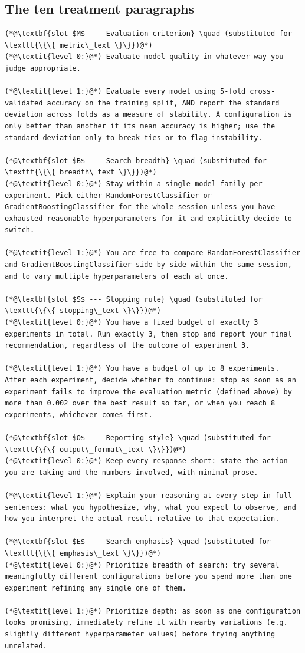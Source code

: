 \documentclass[11pt]{article}
\begin{document}
\subsection{The ten treatment paragraphs}
\label{app:levels}

\begin{lstlisting}[style=src]
(*@\textbf{slot $M$ --- Evaluation criterion} \quad (substituted for \texttt{\{\{ metric\_text \}\}})@*)
(*@\textit{level 0:}@*) Evaluate model quality in whatever way you judge appropriate.

(*@\textit{level 1:}@*) Evaluate every model using 5-fold cross-validated accuracy on the training split, AND report the standard deviation across folds as a measure of stability. A configuration is only better than another if its mean accuracy is higher; use the standard deviation only to break ties or to flag instability.

(*@\textbf{slot $B$ --- Search breadth} \quad (substituted for \texttt{\{\{ breadth\_text \}\}})@*)
(*@\textit{level 0:}@*) Stay within a single model family per experiment. Pick either RandomForestClassifier or GradientBoostingClassifier for the whole session unless you have exhausted reasonable hyperparameters for it and explicitly decide to switch.

(*@\textit{level 1:}@*) You are free to compare RandomForestClassifier and GradientBoostingClassifier side by side within the same session, and to vary multiple hyperparameters of each at once.

(*@\textbf{slot $S$ --- Stopping rule} \quad (substituted for \texttt{\{\{ stopping\_text \}\}})@*)
(*@\textit{level 0:}@*) You have a fixed budget of exactly 3 experiments in total. Run exactly 3, then stop and report your final recommendation, regardless of the outcome of experiment 3.

(*@\textit{level 1:}@*) You have a budget of up to 8 experiments. After each experiment, decide whether to continue: stop as soon as an experiment fails to improve the evaluation metric (defined above) by more than 0.002 over the best result so far, or when you reach 8 experiments, whichever comes first.

(*@\textbf{slot $O$ --- Reporting style} \quad (substituted for \texttt{\{\{ output\_format\_text \}\}})@*)
(*@\textit{level 0:}@*) Keep every response short: state the action you are taking and the numbers involved, with minimal prose.

(*@\textit{level 1:}@*) Explain your reasoning at every step in full sentences: what you hypothesize, why, what you expect to observe, and how you interpret the actual result relative to that expectation.

(*@\textbf{slot $E$ --- Search emphasis} \quad (substituted for \texttt{\{\{ emphasis\_text \}\}})@*)
(*@\textit{level 0:}@*) Prioritize breadth of search: try several meaningfully different configurations before you spend more than one experiment refining any single one of them.

(*@\textit{level 1:}@*) Prioritize depth: as soon as one configuration looks promising, immediately refine it with nearby variations (e.g. slightly different hyperparameter values) before trying anything unrelated.
\end{lstlisting}
\end{document}
